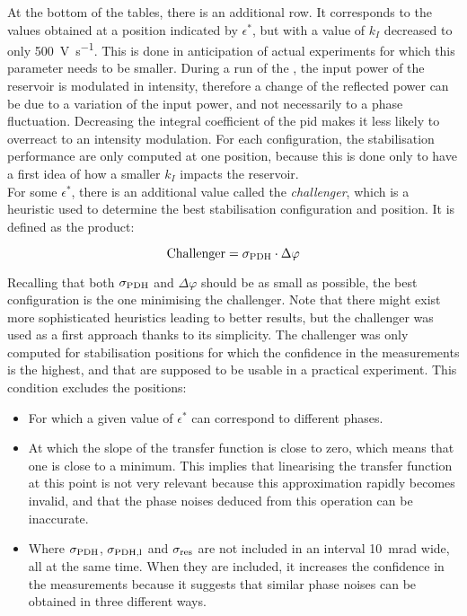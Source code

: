  At the bottom of the tables, there is an additional row. It corresponds to the values obtained at a position indicated by $\epsilon^*$, but with a value of $k_I$ decreased to only \SI{500}{\volt\per\second}. This is done in anticipation of actual \rcer experiments for which this parameter needs to be smaller. During a run of the \rcer, the input power of the reservoir is modulated in intensity, therefore a change of the reflected power can be due to a variation of the input power, and not necessarily to a phase fluctuation. Decreasing the integral coefficient of the \gls{pid} makes it less likely to overreact to an intensity modulation. For each configuration, the stabilisation performance are only computed at one position, because this is done only to have a first idea of how a smaller $k_I$ impacts the reservoir.\\

For some $\epsilon^*$, there is an additional value called the \textit{challenger}, which is a heuristic used to determine the best stabilisation configuration and position. It is defined as the product:

\begin{equation}
	\text{Challenger} = \sigma_{\text{PDH}} \cdot \Delta \varphi
\end{equation}

Recalling that both $\sigma_{\text{PDH}}$ and $\Delta \varphi$ should be as small as possible, the best configuration is the one minimising the challenger. Note that there might exist more sophisticated heuristics leading to better results, but the challenger was used as a first approach thanks to its simplicity. The challenger was only computed for stabilisation positions for which the confidence in the measurements is the highest, and that are supposed to be usable in a practical \rc experiment. This condition excludes the positions:

\begin{itemize}
	\item For which a given value of $\epsilon^*$ can correspond to different phases.
	\item At which the slope of the transfer function is close to zero, which means that one is close to a minimum. This implies that linearising the transfer function at this point is not very relevant because this approximation rapidly becomes invalid, and that the phase noises deduced from this operation can be inaccurate.
	\item Where $\sigma_{\text{PDH}}$,  $\sigma_{\text{PDH,l}}$ and $\sigma_{\text{res}}$ are not included in an interval \SI{10}{\milli\radian} wide, all at the same time. When they are included, it increases the confidence in the measurements because it suggests that similar phase noises can be obtained in three different ways.
\end{itemize}

